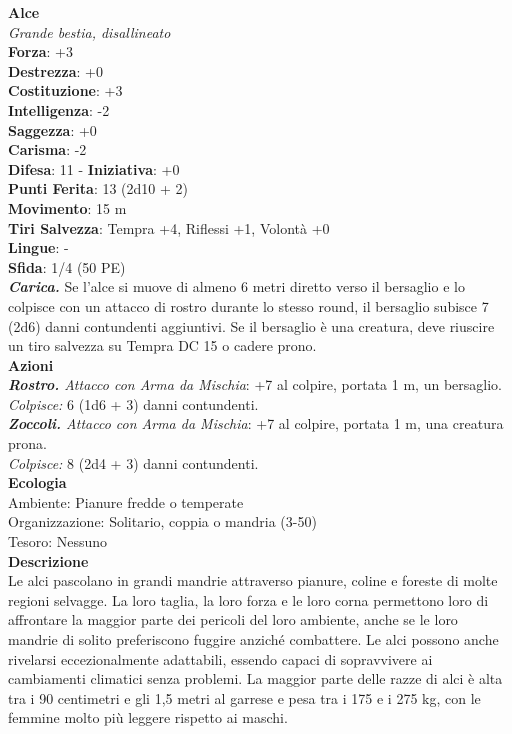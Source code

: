\begin{multicols}{2}
\medskip\textbf{Alce}\\
\emph{Grande bestia, disallineato}\\
\textbf{Forza}: +3\\
\textbf{Destrezza}: +0\\
\textbf{Costituzione}: +3\\
\textbf{Intelligenza}: -2\\
\textbf{Saggezza}: +0\\
\textbf{Carisma}: -2\\
\textbf{Difesa}: 11 - \textbf{Iniziativa}: +0\\
\textbf{Punti Ferita}: 13 (2d10 + 2)\\
\textbf{Movimento}: 15 m\\
\textbf{Tiri Salvezza}:  Tempra +4, Riflessi +1, Volontà +0\\
\textbf{Lingue}: -\\
\textbf{Sfida}: 1/4 (50 PE)\smallskip\\
\emph{\textbf{Carica.}} Se l'alce si muove di almeno 6 metri diretto verso il bersaglio e lo colpisce con un attacco di rostro durante lo stesso round, il bersaglio subisce 7 (2d6) danni contundenti aggiuntivi. Se il bersaglio è una creatura, deve riuscire un tiro salvezza su Tempra DC  15 o cadere prono.\\
\smallskip\textbf{Azioni}\\
\emph{\textbf{Rostro.} Attacco con Arma da Mischia}: +7 al colpire, portata 1 m, un bersaglio.\\
\emph{Colpisce:} 6 (1d6 + 3) danni contundenti.\\
\emph{\textbf{Zoccoli.} Attacco con Arma da Mischia}: +7 al colpire, portata 1 m, una creatura prona.\\
\emph{Colpisce:} 8 (2d4 + 3) danni contundenti.\\
\textbf{Ecologia}\\
Ambiente: Pianure fredde o temperate\\
Organizzazione: Solitario, coppia o mandria (3-50)\\
Tesoro: Nessuno\\
\textbf{Descrizione}\\
Le alci pascolano in grandi mandrie attraverso pianure, coline e foreste di molte regioni selvagge. La loro taglia, la loro forza e le loro corna permettono loro di affrontare la maggior parte dei pericoli del loro ambiente, anche se le loro mandrie di solito preferiscono fuggire anziché combattere. Le alci possono anche rivelarsi eccezionalmente adattabili, essendo capaci di sopravvivere ai cambiamenti climatici senza problemi. La maggior parte delle razze di alci è alta tra i 90 centimetri e gli 1,5 metri al garrese e pesa tra i 175 e i 275 kg, con le femmine molto più leggere rispetto ai maschi.\\


\end{multicols}
